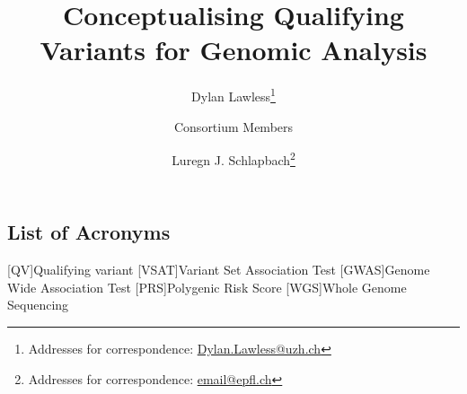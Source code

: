 
\usepackage[printonlyused,withpage,nohyperlinks]{acronym}
% 



%

\title{Conceptualising Qualifying Variants for Genomic Analysis}

\author[1]{Dylan Lawless\thanks{Addresses for correspondence: \href{mailto:Dylan.Lawless@uzh.ch}{Dylan.Lawless@uzh.ch}}}
\author[1]{Consortium Members}
\author[1]{Luregn J. Schlapbach\thanks{Addresses for correspondence: \href{mailto:email@epfl.ch}{email@epfl.ch}}}


\maketitle
\justify
\begin{small}
\tableofcontents

\section{List of Acronyms}
\begin{acronym}
 [QV]{Qualifying variant}
 [VSAT]{Variant Set Association Test}
 [GWAS]{Genome Wide Association Test}
 [PRS]{Polygenic Risk Score}
  [WGS]{Whole Genome Sequencing}
\end{acronym}
\end{small}

